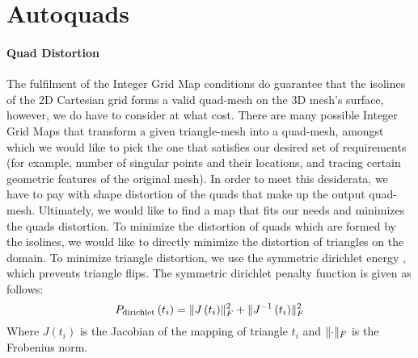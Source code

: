 \chapter{Autoquads}

\subsubsection{Quad Distortion}
The fulfilment of the Integer Grid Map conditions do guarantee that the isolines of the 2D Cartesian grid forms a valid quad-mesh on the 3D mesh's surface, however, we do have to consider at what cost. There are many possible Integer Grid Maps that transform a given triangle-mesh into a quad-mesh, amongst which we would like to pick the one that satisfies our desired set of requirements (for example, number of singular points and their locations, and tracing certain geometric features of the original mesh). In order  to meet this desiderata, we have to pay with shape distortion of the quads that make up the output quad-mesh. Ultimately, we would like to find a map that fits our needs and minimizes the quads distortion. To minimize the distortion of quads which are formed by the isolines, we would like to directly minimize the distortion of triangles on the domain. To minimize triangle distortion, we use the symmetric dirichlet energy \cite{10.1145/2766947}, which prevents triangle flips. The symmetric dirichlet penalty function is given as follows:
$$
P_{\mathrm{dirichlet}}\left(t_i\right) = \lVert J\left(t_i\right)\rVert_F^2 + \lVert J^{-1}\left(t_i\right)\rVert_F^2 \nonumber
$$
Where $J\left(t_i\right)$ is the Jacobian of the mapping of triangle $t_i$ and $\lVert\cdot\rVert_F$ is the Frobenius norm.